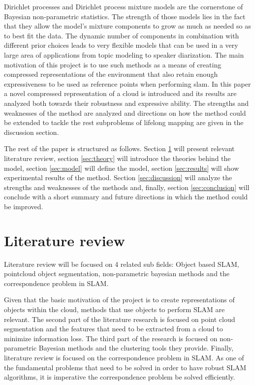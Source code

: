 \documentclass[twoside,hidelinks]{article}
\begin{document}
Dirichlet processes and Dirichlet process mixture models \cite{nonParam} are the cornerstone of Bayesian non-parametric statistics. The strength of those models lies in the fact that they allow the model's mixture components to grow as much as needed so as to best fit the data. The dynamic number of components in combination with different prior choices leads to very flexible models that can be used in a very large area of applications from topic modeling\cite{LDA} to speaker diarization\cite{speakerDiar}.
The main motivation of this project is to use such methods as a means of creating compressed representations of the environment that also retain enough expressiveness to be used as reference points when performing slam. In this paper a novel compressed representation of a cloud is introduced and its results are analyzed both towards their robustness and expressive ability. The strengths and weaknesses of the method are analyzed and directions on how the method could be extended to tackle the rest subproblems of lifelong mapping are given in the discussion section.

The rest of the paper is structured as follows. Section \ref{sec:literature} will present relevant literature review, section \ref{sec:theory} will introduce the theories behind the model, section \ref{sec:model} will define the model, section \ref{sec:results} will show experimental results of the method. Section \ref{sec:discussion} will analyze the strengths and weaknesses of the methods and, finally, section \ref{sec:conclusion} will conclude with a short summary and future directions in which the method could be improved.


\newpage
\section{Literature review}
\label{sec:literature}

Literature review will be focused on 4 related sub fields: Object based SLAM, pointcloud object segmentation, non-parametric bayesian methods and the correspondence problem in SLAM.

Given that the basic motivation of the project is to create representations of objects within the cloud, methods that use objects to perform SLAM are relevant. The second part of the literature research is focused on point cloud segmentation and the features that need to be extracted from a cloud to minimize information loss. The third part of the research is focused on non-parametric Bayesian methods and the clustering tools they provide. Finally, literature review is focused on the correspondence problem in SLAM. As one of the fundamental problems that need to be solved in order to have robust SLAM algorithms, it is imperative the correspondence problem be solved efficiently. 
\end{document}
